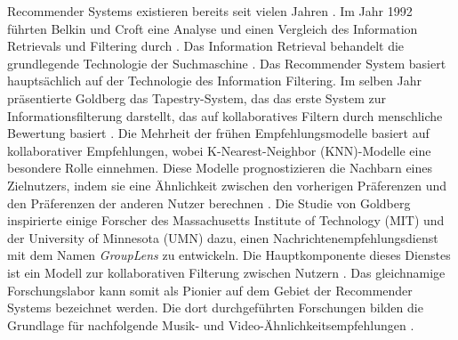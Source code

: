 Recommender Systems existieren bereits seit vielen Jahren \cite{dong2022brief}. Im Jahr 1992 führten Belkin und Croft eine Analyse und einen Vergleich des Information Retrievals und Filtering durch \cite{dong2022brief}. Das Information Retrieval behandelt die grundlegende Technologie der Suchmaschine \cite{dong2022brief}. Das Recommender System basiert hauptsächlich auf der Technologie des Information Filtering. Im selben Jahr präsentierte Goldberg das Tapestry-System, das das erste System zur Informationsfilterung darstellt, das auf kollaboratives Filtern durch menschliche Bewertung basiert \cite{dong2022brief}. Die Mehrheit der frühen Empfehlungsmodelle basiert auf kollaborativer Empfehlungen, wobei K-Nearest-Neighbor (KNN)-Modelle eine besondere Rolle einnehmen. Diese Modelle prognostizieren die Nachbarn eines Zielnutzers, indem sie eine Ähnlichkeit zwischen den vorherigen Präferenzen und den Präferenzen der anderen Nutzer berechnen \cite{dong2022brief}. Die Studie von Goldberg inspirierte einige Forscher des Massachusetts Institute of Technology (MIT) und der University of Minnesota (UMN) dazu, einen Nachrichtenempfehlungsdienst mit dem Namen \emph{GroupLens} zu entwickeln. Die Hauptkomponente dieses Dienstes ist ein Modell zur kollaborativen Filterung zwischen Nutzern \cite{dong2022brief}. Das gleichnamige Forschungslabor kann somit als Pionier auf dem Gebiet der Recommender Systems bezeichnet werden. Die dort durchgeführten Forschungen bilden die Grundlage für nachfolgende Musik- und Video-Ähnlichkeitsempfehlungen \cite{dong2022brief}. \\

